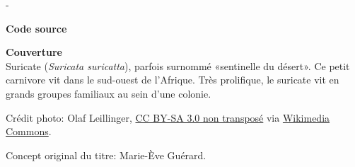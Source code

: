 \begin{adjustwidth*}{\unitlength}{-\unitlength}

  \textbf{Code source} \\
  \viewsource{\ghurl}

  \textbf{Couverture} \\
  Suricate (\emph{Suricata suricatta}), parfois surnommé «sentinelle
  du désert». Ce petit carnivore vit dans le sud-ouest de l'Afrique.
  Très prolifique, le suricate vit en grands groupes familiaux au sein
  d'une colonie.

  Crédit photo: {\textcopyright} Olaf Leillinger,
    \href{https://creativecommons.org/licenses/by-sa/3.0/deed.fr}{CC
      BY-SA 3.0 non transposé} via
  \href{https://commons.wikimedia.org/wiki/File:Suricata.suricatta.6861.jpg}{%
    Wikimedia Commons}.

  Concept original du titre: Marie-Ève Guérard.
\end{adjustwidth*}
\endgroup

